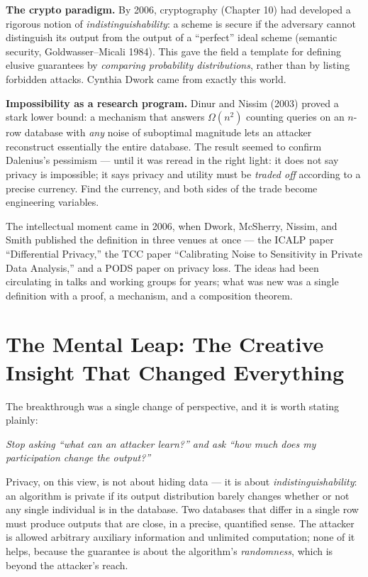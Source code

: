 \textbf{The crypto paradigm.} By 2006, cryptography (Chapter 10) had developed a rigorous notion of \emph{indistinguishability}: a scheme is secure if the adversary cannot distinguish its output from the output of a ``perfect'' ideal scheme (semantic security, Goldwasser--Micali 1984). This gave the field a template for defining elusive guarantees by \emph{comparing probability distributions}, rather than by listing forbidden attacks. Cynthia Dwork came from exactly this world. 

\textbf{Impossibility as a research program.} Dinur and Nissim (2003) proved a stark lower bound: a mechanism that answers $\Omega(n^2)$ counting queries on an $n$-row database with \emph{any} noise of suboptimal magnitude lets an attacker reconstruct essentially the entire database.  The result seemed to confirm Dalenius's pessimism --- until it was reread in the right light: it does not say privacy is impossible; it says privacy and utility must be \emph{traded off} according to a precise currency. Find the currency, and both sides of the trade become engineering variables.

The intellectual moment came in 2006, when Dwork, McSherry, Nissim, and Smith published the definition in three venues at once --- the ICALP paper ``Differential Privacy,'' the TCC paper ``Calibrating Noise to Sensitivity in Private Data Analysis,'' and a PODS paper on privacy loss. \cite{dwork2006} \cite{dwork2006b} The ideas had been circulating in talks and working groups for years; what was new was a single definition with a proof, a mechanism, and a composition theorem.

\section{The Mental Leap: The Creative Insight That Changed Everything}
\label{sec:dp:leap}

The breakthrough was a single change of perspective, and it is worth stating plainly:

\emph{Stop asking ``what can an attacker learn?'' and ask ``how much does my participation change the output?''}

Privacy, on this view, is not about hiding data --- it is about \emph{indistinguishability}: an algorithm is private if its output distribution barely changes whether or not any single individual is in the database.  Two databases that differ in a single row must produce outputs that are close, in a precise, quantified sense. The attacker is allowed arbitrary auxiliary information and unlimited computation; none of it helps, because the guarantee is about the algorithm's \emph{randomness}, which is beyond the attacker's reach. 

